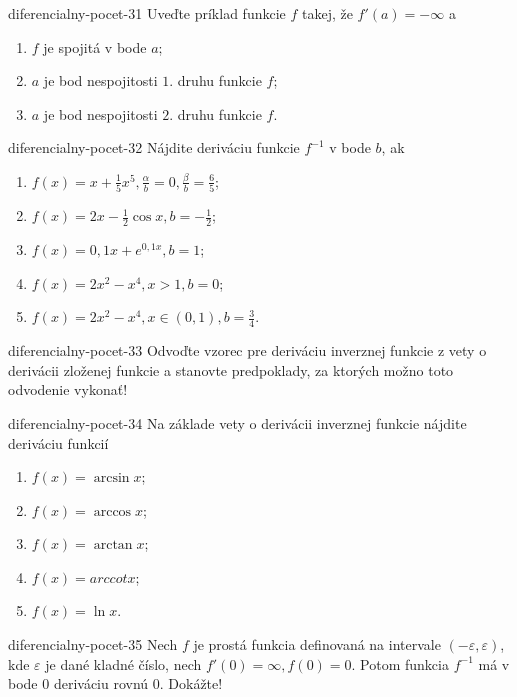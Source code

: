 \begin{defproblem}{diferencialny-pocet-31}
Uveďte príklad funkcie $f$ takej, že $f'(a)=-\infty$ a
\begin{enumerate}
\item $f$ je spojitá v bode $a$;
\item $a$ je bod nespojitosti $1.$ druhu funkcie $f$;
\item $a$ je bod nespojitosti $2.$ druhu funkcie $f$.
\end{enumerate}
\end{defproblem}

\begin{defproblem}{diferencialny-pocet-32}
Nájdite deriváciu funkcie $f^{-1}$ v bode $b$, ak
\begin{enumerate}
\item $f(x)=x+\frac{1}{5}x^5,\frac{\alpha}{b}=0,\frac{\beta}{b}=\frac{6}{5}$;
\item $f(x)=2x-\frac{1}{2}\cos x,b=-\frac{1}{2}$;
\item $f(x)=0,1x+e^{0,1x},b=1$;
\item $f(x)=2x^2-x^4,x>1,b=0$;
\item $f(x)=2x^2-x^4,x\in (0,1),b=\frac{3}{4}$.
\end{enumerate}
\end{defproblem}

\begin{defproblem}{diferencialny-pocet-33}
Odvoďte vzorec pre deriváciu inverznej funkcie z vety o derivácii zloženej funkcie a stanovte predpoklady, za ktorých možno toto odvodenie vykonať!
\end{defproblem}

\begin{defproblem}{diferencialny-pocet-34}
Na základe vety o derivácii inverznej funkcie nájdite deriváciu funkcií
\begin{multicols}{2}
\begin{enumerate}
    \item $f(x)=\arcsin x$;
    \item $f(x)=\arccos x$;
    \item $f(x)=\arctan x$;
    \item $f(x)=arccot x$;
    \item $f(x)=\ln x$.
\end{enumerate}
\end{multicols}
\end{defproblem}

\begin{defproblem}{diferencialny-pocet-35}
Nech $f$ je prostá funkcia definovaná na intervale $(-\varepsilon,\varepsilon)$, kde $\varepsilon$ je dané kladné číslo, nech $f'(0)=\infty,f(0)=0$. Potom funkcia $f^{-1}$ má v bode $0$ deriváciu rovnú $0$. Dokážte!
\end{defproblem}


